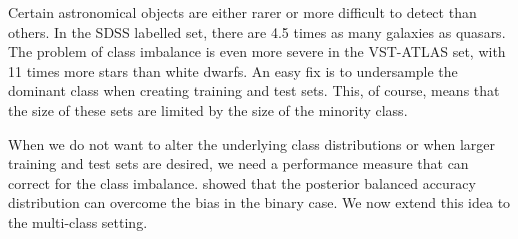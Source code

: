 Certain astronomical objects are either rarer or more difficult to detect than others. In the SDSS
labelled set, there are 4.5 times as many galaxies as quasars. The problem of class imbalance is
even more severe in the VST-ATLAS set, with 11 times more stars than white dwarfs. An easy fix is
to undersample the dominant class when creating training and test sets. This, of course, means that
the size of these sets are limited by the size of the minority class.

When we do not want to alter the underlying class distributions or when larger training and test
sets are desired, we need a performance measure that can correct for the class imbalance.
 showed that the posterior balanced accuracy distribution can overcome the
bias in the binary case. We now extend this idea to the multi-class setting.

